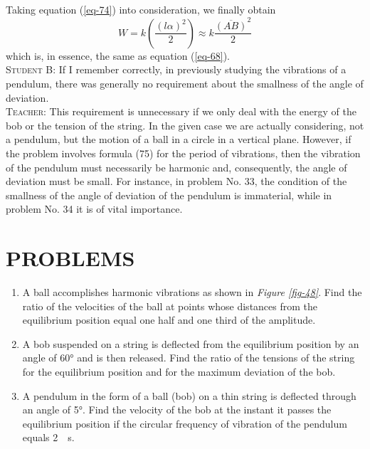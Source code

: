 \documentclass[a4paper,sfsidenotes]{tufte-book}
\begin{document}
Taking equation (\ref{eq-74}) into consideration, we finally obtain
\\
\begin{equation*}
W = k \left( \frac{(l \alpha)^{2}}{2}\right) \approx k \frac{\overline{(AB)}^{2}}{2}
\end{equation*}
which is, in essence, the same as equation (\ref{eq-68}).
\\
\textsc{Student B:} If I remember correctly, in previously studying the vibrations of a pendulum, there was generally no requirement about the smallness of the angle of deviation.
\\
\textsc{Teacher:} This requirement is unnecessary if we only deal with the energy of the bob or the tension of the string. In the given case we are actually considering, not a pendulum, but the motion of a ball in a circle in a vertical plane. However, if the problem involves formula (75) for the period of vibrations, then the vibration of the pendulum must necessarily be harmonic and, consequently, the angle of deviation must be small. For instance, in problem No. 33, the condition of the smallness of the angle of deviation of the pendulum is immaterial, while in problem No. 34 it is of vital importance.
\\
\section{PROBLEMS}
\label{problems-06}

\begin{enumerate}[resume*=problems]
\item A ball accomplishes harmonic vibrations as shown in \emph{Figure \ref{fig-48}}. Find the ratio of the velocities of the ball at points whose distances from the equilibrium position equal one half and one third of the amplitude.

\item A bob suspended on a string is deflected from the equilibrium position by an angle of \ang{60} and is then released. Find the ratio of the tensions of the string for the equilibrium position and for the maximum deviation of the bob.

\item A pendulum in the form of a ball (bob) on a thin string is deflected through an angle of \ang{5}. Find the velocity of the bob at the instant it passes the equilibrium position if the circular frequency of vibration of the pendulum equals \SI{2}{\per\second}.
\end{enumerate}
\end{document}

